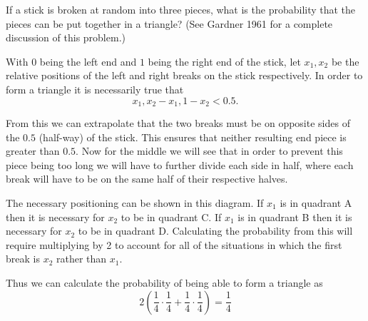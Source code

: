 \documentclass[12pt,letterpaper]{exam}
\begin{document}
\begin{questions}
\begin{solution}
\begin{parts}
		\end{parts}
	\end{solution}

	\setcounter{question}{11}
	\question 
	If a stick is broken at random into three pieces, what is the probability that the pieces
	can be put together in a triangle? (See Gardner 1961 for a complete discussion of this
	problem.)
	
	\begin{solution}
		With \(0\) being the left end and \(1\) being the right end of the stick,
		let \(x_1,x_2\) be the relative positions of the left and right breaks on the stick respectively.
		In order to form a triangle it is necessarily true that
		\[x_1, x_2-x_1, 1-x_2 <0.5.\]
		
		From this we can extrapolate that the two breaks must be on opposite sides of the \(0.5\) (half-way) of the stick.
		This ensures that neither resulting end piece is greater than \(0.5\).
		Now for the middle we will see that in order to prevent this piece being too long we will have to further 
		divide each side in half, where each break will have to be on the same half of their respective halves.
 		
 		\begin{center}
 		\end{center}
		
		The necessary positioning can be shown in this diagram. 
		If \(x_1\) is in quadrant A then it is necessary for \(x_2\) to be in quadrant C.
		If \(x_1\) is in quadrant B then it is necessary for \(x_2\) to be in quadrant D.
		Calculating the probability from this will require multiplying by 2
		to account for all of the situations in which the first break is \(x_2\) rather than \(x_1\).
		
		Thus we can calculate the probability of being able to form a triangle as
		\[ 2\left(\frac{1}{4} \cdot \frac{1}{4} + \frac{1}{4} \cdot \frac{1}{4}\right) = \frac{1}{4} \]
		
	\end{solution}


\end{questions}
\end{document}
